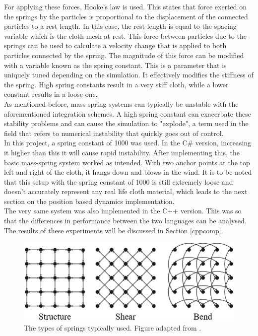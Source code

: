 \documentclass[12pt,a4paper]{article}
\begin{document}
For applying these forces, Hooke's law is used. This states that force exerted on the springs by the particles is proportional to the displacement of the connected particles to a rest length. In this case, the rest length is equal to the spacing variable which is the cloth mesh at rest. This force between particles due to the springs can be used to calculate a velocity change that is applied to both particles connected by the spring. The magnitude of this force can be modified with a variable known as the spring constant. This is a parameter that is uniquely tuned depending on the simulation. It effectively modifies the stiffness of the spring. High spring constants result in a very stiff cloth, while a lower constant results in a loose one. \\
As mentioned before, mass-spring systems can typically be unstable with the aforementioned integration schemes. A high spring constant can exacerbate these stability problems and can cause the simulation to "explode", a term used in the field that refers to numerical instability that quickly goes out of control. \\

In this project, a spring constant of 1000 was used. In the C\# version, increasing it higher than this it will cause rapid instability. After implementing this, the basic mass-spring system worked as intended. With two anchor points at the top left and right of the cloth, it hangs down and blows in the wind. It is to be noted that this setup with the spring constant of 1000 is still extremely loose and doesn't accurately represent any real life cloth material, which leads to the next section on the position based dynamics implementation. \\

The very same system was also implemented in the C++ version. This was so that the differences in performance between the two languages can be analysed. The results of these experiments will be discussed in Section \ref{cppcomp}.

\begin{figure}
	\centering
	\includegraphics[scale=0.4]{springs.png}
	\caption{The types of springs typically used. Figure adapted from \protect\cite{springs}.}
	\label{fig:mss}
\end{figure}
\end{document}
